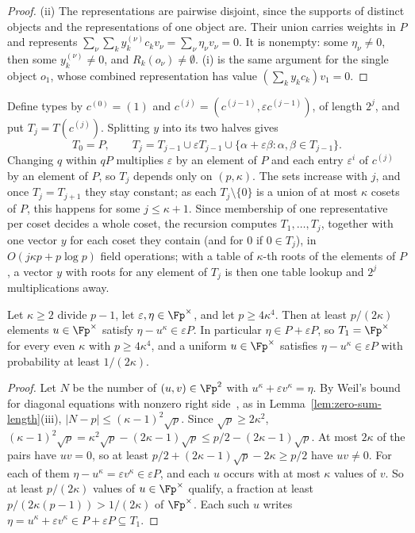 \begin{proof}
(ii) The representations are pairwise disjoint, since the supports of distinct objects and the representations of one object are. Their union carries weights in $P$ and represents $\sum_\nu\sum_ky^{(\nu)}_kc_kv_\nu = \sum_\nu\eta_\nu v_\nu = 0$. It is nonempty: some $\eta_\nu \ne 0$, then some $y^{(\nu)}_k \ne 0$, and $R_k(o_\nu) \ne \emptyset$. (i) is the same argument for the single object $o_1$, whose combined representation has value $(\sum_ky_kc_k)v_1 = 0$.
\end{proof}

Define types by $c^{(0)} = (1)$ and $c^{(j)} = (c^{(j-1)},\varepsilon c^{(j-1)})$, of length $2^j$, and put $T_j = T(c^{(j)})$. Splitting $y$ into its two halves gives
\[
  T_0 = P, \qquad T_j = T_{j-1} \cup \varepsilon T_{j-1} \cup \{\alpha+\varepsilon\beta : \alpha,\beta \in T_{j-1}\} .
\]
Changing $q$ within $qP$ multiplies $\varepsilon$ by an element of $P$ and each entry $\varepsilon^i$ of $c^{(j)}$ by an element of $P$, so $T_j$ depends only on $(p,\kappa)$. The sets increase with $j$, and once $T_j = T_{j+1}$ they stay constant; as each $T_j\setminus\{0\}$ is a union of at most $\kappa$ cosets of $P$, this happens for some $j \le \kappa+1$. Since membership of one representative per coset decides a whole coset, the recursion computes $T_1,\dots,T_j$, together with one vector $y$ for each coset they contain (and for $0$ if $0 \in T_j$), in $O(j\kappa p + p\log p)$ field operations; with a table of $\kappa$-th roots of the elements of $P$, a vector $y$ with roots for any element of $T_j$ is then one table lookup and $2^j$ multiplications away.

\begin{lemma}
\label{lem:two-term}
Let $\kappa \ge 2$ divide $p-1$, let $\varepsilon, \eta \in \Fp^\times$, and let $p \ge 4\kappa^4$. Then at least $p/(2\kappa)$ elements $u \in \Fp^\times$ satisfy $\eta - u^\kappa \in \varepsilon P$. In particular $\eta \in P + \varepsilon P$, so $T_1 = \Fp^\times$ for every even $\kappa$ with $p \ge 4\kappa^4$, and a uniform $u \in \Fp^\times$ satisfies $\eta - u^\kappa \in \varepsilon P$ with probability at least $1/(2\kappa)$.
\end{lemma}

\begin{proof}
Let $N$ be the number of $(u,v) \in \Fp^2$ with $u^\kappa + \varepsilon v^\kappa = \eta$. By Weil's bound for diagonal equations with nonzero right side~\cite[Chapter~6]{LidlNiederreiter1997}, as in Lemma~\ref{lem:zero-sum-length}(iii), $|N - p| \le (\kappa-1)^2\sqrt p$. Since $\sqrt p \ge 2\kappa^2$, $(\kappa-1)^2\sqrt p = \kappa^2\sqrt p - (2\kappa-1)\sqrt p \le p/2 - (2\kappa-1)\sqrt p$. At most $2\kappa$ of the pairs have $uv = 0$, so at least $p/2 + (2\kappa-1)\sqrt p - 2\kappa \ge p/2$ have $uv \ne 0$. For each of them $\eta - u^\kappa = \varepsilon v^\kappa \in \varepsilon P$, and each $u$ occurs with at most $\kappa$ values of $v$. So at least $p/(2\kappa)$ values of $u \in \Fp^\times$ qualify, a fraction at least $p/(2\kappa(p-1)) > 1/(2\kappa)$ of $\Fp^\times$. Each such $u$ writes $\eta = u^\kappa + \varepsilon v^\kappa \in P + \varepsilon P \subseteq T_1$.
\end{proof}

